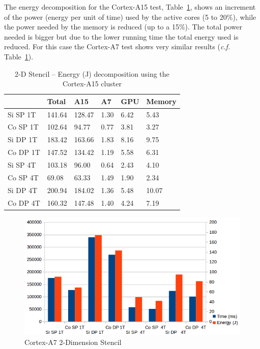 \documentclass{acm_proc_article-sp}
\begin{document}
The energy decomposition for the Cortex-A15 test, Table~\ref{tbl:energy-A15-2D}, shows an increment of the power (energy per unit of time) used by the active cores (5 to 20\%), while the power needed by the memory is reduced (up to a 15\%). The total power needed is bigger but due to the lower running time the total energy used is reduced. For this case the Cortex-A7 test shows very similar results (\textit{c.f.} Table~\ref{tbl:energy-A15-2D}).
\begin{table}[ht]
  \begin{center}
    \begin{tabular}{| l | l | l | l | l | l |}
      \hline
      & Total & A15 & A7 & GPU & Memory \\ \hline
      Si SP 1T & 141.64 & 128.47 & 1.30 & 6.42 & 5.43  \\ \hline
      Co SP 1T & 102.64 & 94.77  & 0.77 & 3.81 & 3.27  \\ \hline
      Si DP 1T & 183.42 & 163.66 & 1.83 & 8.16 & 9.75  \\ \hline
      Co DP 1T & 147.52 & 134.42 & 1.19 & 5.58 & 6.31  \\ \hline
      Si SP 4T & 103.18 & 96.00  & 0.64 & 2.43 & 4.10  \\ \hline
      Co SP 4T & 69.08  & 63.33  & 1.49 & 1.90 & 2.34  \\ \hline
      Si DP 4T & 200.94 & 184.02 & 1.36 & 5.48 & 10.07 \\ \hline
      Co DP 4T & 160.32 & 147.48 & 1.40 & 4.24 & 7.19  \\ \hline
    \end{tabular}
    \caption{2-D Stencil -- Energy (J) decomposition using the Cortex-A15 cluster}
    \label{tbl:energy-A15-2D}
  \end{center}
\end{table}


\begin{figure}[ht!]
  \centering
  \includegraphics[scale=0.5]{results/A7-2D}
  \caption{Cortex-A7 2-Dimension Stencil}
  \label{pic:A7-2d}
\end{figure}
\end{document}
